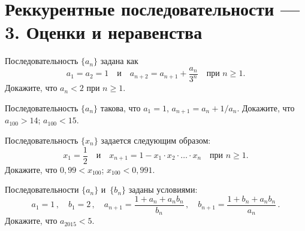 

\section*{Реккурентные последовательности --- 3. Оценки и неравенства}


\begin{problems}

\item
Последовательность $\{ a_{n} \}$ задана как
\[
    a_1 = a_2 = 1
\quad \text{и} \quad
    a_{n+2}
=
    a_{n+1} + \frac{a_{n}}{3^n}
\quad \text{при $n \geq 1$.}
\]
Докажите, что $a_{n} < 2$ при $n \geq 1$.

\item
Последовательность $\{ a_{n} \}$ такова, что
$a_1 = 1$, $a_{n+1} = a_{n} + 1 / a_{n}$.
Докажите, что
\\
\subproblem $a_{100} > 14$;
\qquad
\subproblem $a_{100} < 15$.

\item
Последовательность $\{ x_n \}$ задается следующим образом:
\[
    x_1 = \frac{1}{2}
\quad \text{и} \quad
    x_{n+1}
=
    1 - x_{1} \cdot x_{2} \cdot \ldots \cdot x_{n}
\quad \text{при $n \geq 1$.}
\]
Докажите, что
\qquad
\subproblem $0{,}99 < x_{100}$;
\qquad
\subproblem $x_{100} < 0{,}991$.

\item
Последовательности $\{ a_{n} \}$ и~$\{ b_{n} \}$ заданы условиями:
\[
    a_1 = 1
\, , \quad
    b_1 = 2
\, , \quad
    a_{n+1}
=
    \frac{1 + a_{n} + a_{n} b_{n}}{b_{n}}
\, , \quad
    b_{n+1}
=
    \frac{1 + b_{n} + a_{n} b_{n}}{a_{n}}
\, . \]
Докажите, что $a_{2015} < 5$.

\end{problems}

